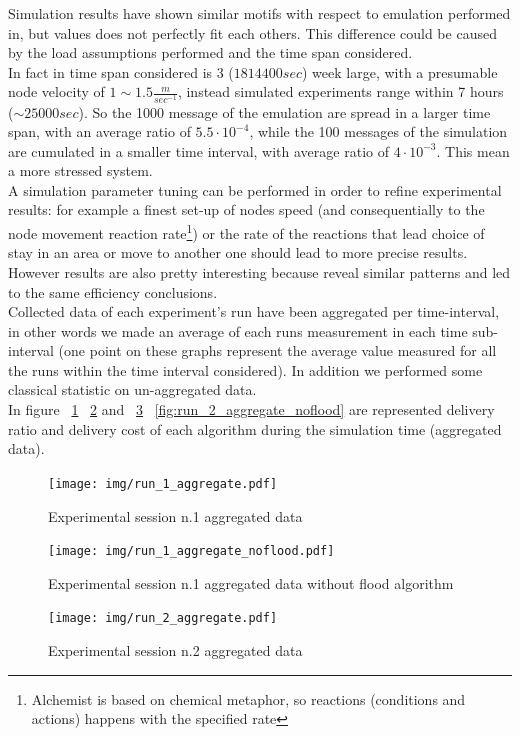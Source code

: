 Simulation results have shown similar motifs with respect to emulation performed in\cite{bubble}, but values does not perfectly fit each others. This difference could be caused by the load assumptions performed and the time span considered.\\
In fact in\cite{bubble} time span considered is 3 ($1814400 sec$) week large, with a presumable node velocity of $1\sim1.5 \frac{m}{sec^{-1}}$, instead simulated experiments range within 7 hours ($\sim 25000 sec$). So the 1000 message of the emulation are spread in a larger time span, with an average ratio of $5.5\cdot 10^{-4}$, while the 100 messages of the simulation are cumulated in a smaller time interval, with average ratio of $4\cdot 10^{-3}$. This mean a more stressed system.\\
A simulation parameter tuning can be performed in order to refine experimental results: for example a finest set-up of nodes speed (and consequentially to the node movement reaction rate\footnote{Alchemist is based on chemical metaphor, so reactions (conditions and actions) happens with the specified rate}) or the rate of the reactions that lead choice of stay in an area or move to another one should lead to more precise results. However results are also pretty interesting because reveal similar patterns and led to the same efficiency conclusions.\\
Collected data of each experiment's run have been aggregated per time-interval, in other words we made an average of each runs measurement in each time sub-interval (one point on these graphs represent the average value measured for all the runs within the time interval considered). In addition we performed some classical statistic on un-aggregated data.\\
In figure ~\ref{fig:run_1_aggregate} ~\ref{fig:run_1_aggregate_noflood} and ~\ref{fig:run_2_aggregate} ~\ref{fig:run_2_aggregate_noflood} are represented delivery ratio and delivery cost of each algorithm during the simulation time (aggregated data).\\
\newpage
\begin{center}
\begin{figure}[h!]
        \centering
    		\label{fig:run_1_aggregate}
    		\texttt{[image: img/run\_1\_aggregate.pdf]}
    		\caption{Experimental session n.1 aggregated data}
\end{figure}
\begin{figure}[h!]
		\centering
    		\label{fig:run_1_aggregate_noflood}
    		\texttt{[image: img/run\_1\_aggregate\_noflood.pdf]}
    		\caption{Experimental session n.1 aggregated data without flood algorithm}
\end{figure}
\end{center}
\newpage
\begin{figure}[h!]
	\begin{center}
    \label{fig:run_2_aggregate}
    \texttt{[image: img/run\_2\_aggregate.pdf]}
    \caption{Experimental session n.2 aggregated data}
  \end{center}
\end{figure}

